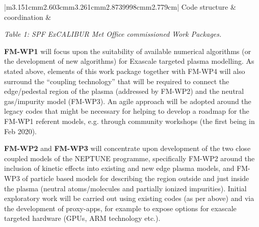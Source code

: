 \documentclass[a4paper]{article}
\makeatletter
\newcommand\arraybslash{\let\\\@arraycr}
\makeatother
\begin{document}
\begin{center}
\begin{supertabular}{|m{3.151cm}m{2.603cm}m{3.261cm}m{2.8739998cm}m{2.779cm}|}
\centering\arraybslash{ Code structure \& coordination}\\\hline
{}\\\hline
{} &
\\\hline
\end{supertabular}
\end{center}

\bigskip

{\centering
\textit{Table 1: SPF ExCALIBUR Met Office commissioned Work Packages.}
\par}


\bigskip

\textbf{FM-WP1} will focus upon the suitability of available numerical algorithms (or the development of new algorithms)
for Exascale targeted plasma modelling. As stated above, elements of this work package together with FM-WP4 will also
surround the ``coupling technology'' that will be required to connect the edge/pedestal region of the plasma (addressed
by FM-WP2) and the neutral gas/impurity model (FM-WP3). An agile approach will be adopted around the legacy codes that
might be necessary for helping to develop a roadmap for the FM-WP1 referent models, e.g. through community workshops
(the first being in Feb 2020).


\bigskip

\textbf{FM-WP2} and \textbf{FM-WP3} will concentrate upon development of the two close coupled models of the NEPTUNE
programme, specifically FM-WP2 around the inclusion of kinetic effects into existing and new edge plasma models, and
FM-WP3 of particle based models for describing the region outside and just inside the plasma (neutral atoms/molecules
and partially ionized impurities). Initial exploratory work will be carried out using existing codes (as per above) and
via the development of proxy-apps, for example to expose options for exascale targeted hardware (GPUs, ARM technology
etc.).
\end{document}
